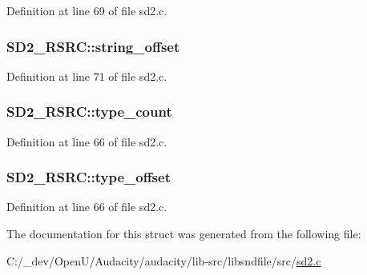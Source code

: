Definition at line 69 of file sd2.\+c.

\subsubsection[{\texorpdfstring{string\+\_\+offset}{string_offset}}]{ S\+D2\+\_\+\+R\+S\+R\+C\+::string\+\_\+offset}\hypertarget{struct_s_d2___r_s_r_c_aed7669bfd2fdad452edd28e3cc796108}{}\label{struct_s_d2___r_s_r_c_aed7669bfd2fdad452edd28e3cc796108}


Definition at line 71 of file sd2.\+c.

\subsubsection[{\texorpdfstring{type\+\_\+count}{type_count}}]{ S\+D2\+\_\+\+R\+S\+R\+C\+::type\+\_\+count}\hypertarget{struct_s_d2___r_s_r_c_ac55968ca4d7f908f39fd952237509886}{}\label{struct_s_d2___r_s_r_c_ac55968ca4d7f908f39fd952237509886}


Definition at line 66 of file sd2.\+c.

\subsubsection[{\texorpdfstring{type\+\_\+offset}{type_offset}}]{ S\+D2\+\_\+\+R\+S\+R\+C\+::type\+\_\+offset}\hypertarget{struct_s_d2___r_s_r_c_a7d3803f0070580106e4aaa0807fc486a}{}\label{struct_s_d2___r_s_r_c_a7d3803f0070580106e4aaa0807fc486a}


Definition at line 66 of file sd2.\+c.



The documentation for this struct was generated from the following file\+:\begin{DoxyCompactItemize}
\item 
C\+:/\+\_\+dev/\+Open\+U/\+Audacity/audacity/lib-\/src/libsndfile/src/\hyperlink{sd2_8c}{sd2.\+c}\end{DoxyCompactItemize}
